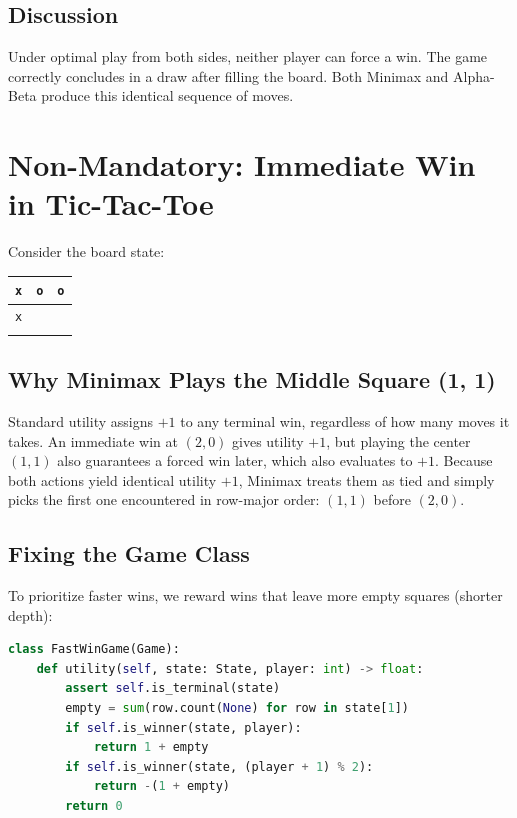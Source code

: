 \documentclass[11pt,a4paper]{article}
\begin{document}
\subsection{Discussion}
Under optimal play from both sides, neither player can force a win. The game correctly concludes in a draw after filling the board. Both Minimax and Alpha-Beta produce this identical sequence of moves.

\section{Non-Mandatory: Immediate Win in Tic-Tac-Toe}

Consider the board state:
\begin{center}
\begin{tabular}{c|c|c}
\texttt{x} & \texttt{o} & \texttt{o} \\ \hline
\texttt{x} &           &           \\ \hline
           &           &          
\end{tabular}
\end{center}

\subsection{Why Minimax Plays the Middle Square (1, 1)}
Standard utility assigns $+1$ to any terminal win, regardless of how many moves it takes. An immediate win at $(2, 0)$ gives utility $+1$, but playing the center $(1, 1)$ also guarantees a forced win later, which also evaluates to $+1$. Because both actions yield identical utility $+1$, Minimax treats them as tied and simply picks the first one encountered in row-major order: $(1, 1)$ before $(2, 0)$.

\subsection{Fixing the Game Class}
To prioritize faster wins, we reward wins that leave more empty squares (shorter depth):

\begin{lstlisting}[language=Python]
class FastWinGame(Game):
    def utility(self, state: State, player: int) -> float:
        assert self.is_terminal(state)
        empty = sum(row.count(None) for row in state[1])
        if self.is_winner(state, player):
            return 1 + empty
        if self.is_winner(state, (player + 1) % 2):
            return -(1 + empty)
        return 0
\end{lstlisting}
\end{document}
